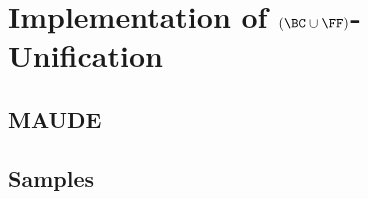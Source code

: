 \chapter{Implementation of \texorpdfstring{$(\BC \cup \FF)$}{(BC U F)}-Unification}\label{chap:implementation}

\section{MAUDE}\label{sec:maude}

\section{Samples}\label{sec:samples}

